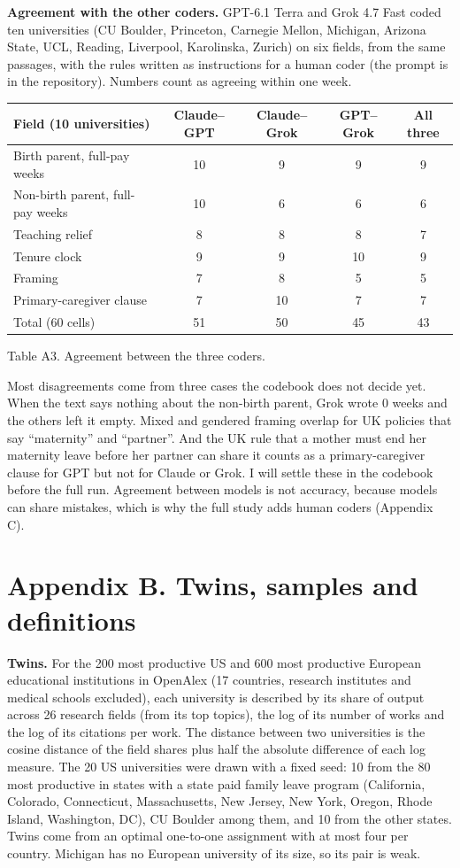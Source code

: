 \documentclass[10pt,twocolumn]{article}
\begin{document}
\textbf{Agreement with the other coders.} GPT-6.1 Terra and Grok 4.7 Fast coded ten universities (CU Boulder, Princeton, Carnegie Mellon, Michigan, Arizona State, UCL, Reading, Liverpool, Karolinska, Zurich) on six fields, from the same passages, with the rules written as instructions for a human coder (the prompt is in the repository). Numbers count as agreeing within one week.

\begin{center}\small
\begin{tabular}{@{}lcccc@{}}
\toprule
Field (10 universities) & Claude--GPT & Claude--Grok & GPT--Grok & All three \\ \midrule
Birth parent, full-pay weeks & 10 & 9 & 9 & 9 \\
Non-birth parent, full-pay weeks & 10 & 6 & 6 & 6 \\
Teaching relief & 8 & 8 & 8 & 7 \\
Tenure clock & 9 & 9 & 10 & 9 \\
Framing & 7 & 8 & 5 & 5 \\
Primary-caregiver clause & 7 & 10 & 7 & 7 \\ \midrule
Total (60 cells) & 51 & 50 & 45 & 43 \\ \bottomrule
\end{tabular}

\smallskip
Table A3. Agreement between the three coders.
\end{center}

Most disagreements come from three cases the codebook does not decide yet. When the text says nothing about the non-birth parent, Grok wrote 0 weeks and the others left it empty. Mixed and gendered framing overlap for UK policies that say ``maternity'' and ``partner''. And the UK rule that a mother must end her maternity leave before her partner can share it counts as a primary-caregiver clause for GPT but not for Claude or Grok. I will settle these in the codebook before the full run. Agreement between models is not accuracy, because models can share mistakes, which is why the full study adds human coders (Appendix C).

\section*{Appendix B. Twins, samples and definitions}
\textbf{Twins.} For the 200 most productive US and 600 most productive European educational institutions in OpenAlex (17 countries, research institutes and medical schools excluded), each university is described by its share of output across 26 research fields (from its top topics), the log of its number of works and the log of its citations per work. The distance between two universities is the cosine distance of the field shares plus half the absolute difference of each log measure. The 20 US universities were drawn with a fixed seed: 10 from the 80 most productive in states with a state paid family leave program (California, Colorado, Connecticut, Massachusetts, New Jersey, New York, Oregon, Rhode Island, Washington, DC), CU Boulder among them, and 10 from the other states. Twins come from an optimal one-to-one assignment with at most four per country. Michigan has no European university of its size, so its pair is weak.
\end{document}
